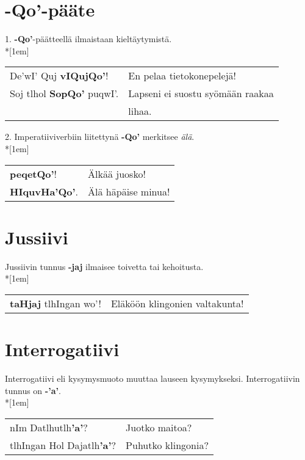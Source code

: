 \documentclass{book}
\begin{document}
\section{-Qo'-pääte}

1. \textbf{-Qo'}-päätteellä ilmaistaan kieltäytymistä.\\*[1em]
\begin{tabular}{l l}
    De'wI' Quj \textbf{vIQujQo'}! & En pelaa tietokonepelejä! \\
    Soj tlhol \textbf{SopQo'} puqwI'. & Lapseni ei suostu syömään raakaa \\
    & lihaa. \\
\end{tabular}

2. Imperatiiviverbiin liitettynä \textbf{-Qo'} merkitsee \textit{älä}.
\\*[1em]
\begin{tabular}{l l}
    \textbf{peqetQo'}! & Älkää juosko! \\
    \textbf{HIquvHa'Qo'}. & Älä häpäise minua! \\
\end{tabular}

\section{Jussiivi}

Jussiivin tunnus \textbf{-jaj} ilmaisee toivetta tai kehoitusta.\\*[1em]
\begin{tabular}{l l}
    \textbf{taHjaj} tlhIngan wo'! & Eläköön klingonien valtakunta! \\
\end{tabular}

\section{Interrogatiivi}

Interrogatiivi eli kysymysmuoto muuttaa lauseen kysymykseksi.
Interrogatiivin tunnus on \textbf{-'a'}.
\\*[1em]
\begin{tabular}{l l}
    nIm Datlhutlh\textbf{'a'}? & Juotko maitoa? \\
    tlhIngan Hol Dajatlh\textbf{'a'}? & Puhutko klingonia? \\
\end{tabular}
\end{document}
